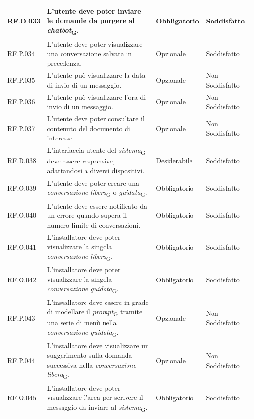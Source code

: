 \begin{table}[H]
\centering
    \begin{tabular}{|C{2.7cm}|L{6.5cm}|C{2.7cm}|C{2.7cm}|}
        \hline
        RF.O.033 & L’utente deve poter inviare le domande da porgere al \textit{chatbot}\textsubscript{G}.
         & Obbligatorio & Soddisfatto \\
        \hline
        RF.P.034 & L’utente deve poter visualizzare una conversazione salvata in precedenza.
         & Opzionale &  Soddisfatto \\
        \hline
        RF.P.035 & L’utente può visualizzare la data di invio di un messaggio.
         & Opzionale & Non Soddisfatto \\
        \hline
        RF.P.036 & L’utente può visualizzare l'ora di invio di un messaggio.
         & Opzionale & Non Soddisfatto \\
        \hline
        RF.P.037 & L’utente deve poter consultare il contenuto del documento di interesse.
         & Opzionale & Non Soddisfatto \\
        \hline
        RF.D.038 & L'interfaccia utente del \textit{sistema}\textsubscript{G} deve essere responsive, adattandosi a diversi dispositivi. & Desiderabile &  Soddisfatto \\
        \hline
        RF.O.039 & L'utente deve poter creare una \textit{conversazione libera}\textsubscript{G} o \textit{guidata}\textsubscript{G}. & Obbligatorio & Soddisfatto \\ \hline
        RF.O.040 & L'utente deve essere notificato da un errore quando supera il numero limite di conversazioni. & Obbligatorio & Soddisfatto \\ \hline
        RF.O.041 & L'installatore deve poter visualizzare la singola \textit{conversazione libera}\textsubscript{G}. & Obbligatorio & Soddisfatto \\ \hline 
        RF.O.042 & L'installatore deve poter visualizzare la singola \textit{conversazione guidata}\textsubscript{G}. & Obbligatorio & Soddisfatto \\ \hline
        RF.P.043 & L'installatore deve essere in grado di modellare il \textit{prompt}\textsubscript{G} tramite una serie di menù nella \textit{conversazione guidata}\textsubscript{G}. & Opzionale & Non Soddisfatto \\
        \hline
        RF.P.044 & L'installatore deve visualizzare un suggerimento sulla domanda successiva nella \textit{conversazione libera}\textsubscript{G}. & Opzionale & Non Soddisfatto \\ \hline
        RF.O.045 & L'installatore deve poter visualizzare l'area per scrivere il messaggio da inviare al \textit{sistema}\textsubscript{G}. & Obbligatorio & Soddisfatto \\ \hline
        

\end{tabular}
\end{table}
